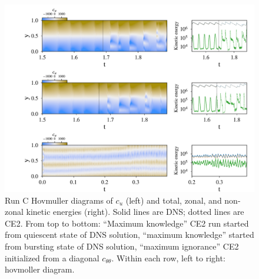 \documentclass{jfm}
\newcommand{\cu}{c_u}
\newcommand{\ctt}{c_{\theta \theta}}
\begin{document}
\begin{figure}
  \centering
  \includegraphics[width=\textwidth]{../../figs/run_C_fig.pdf}
  \caption{Run C Hovmuller diagrams of $\cu$ (left) and total, zonal, and non-zonal kinetic energies (right). Solid lines are DNS; dotted lines are CE2. From top to bottom: ``Maximum knowledge'' CE2 run started from quiescent state of DNS solution, ``maximum knowledge'' started from bursting state of DNS solution, ``maximum ignorance'' CE2 initialized from a diagonal $\ctt$. Within each row, left to right: hovmoller diagram. }
  \label{fig:run_C}
\end{figure}
\end{document}
